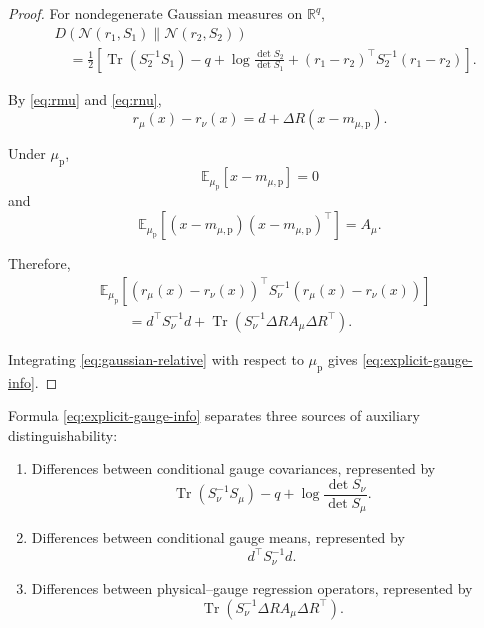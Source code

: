 \documentclass[11pt]{article}
\theoremstyle{remark}
\newcommand{\R}{\mathbb{R}}
\newcommand{\Tr}{\operatorname{Tr}}
\begin{document}
\begin{proof}
For nondegenerate Gaussian measures on \(\R^q\),
\begin{align}
&D\left(
\mathcal N(r_1,S_1)
\middle\|
\mathcal N(r_2,S_2)
\right)
\nonumber\\
&\quad=
\frac12
\left[
\Tr(S_2^{-1}S_1)
-
q
+
\log
\frac{
\det S_2
}{
\det S_1
}
+
(r_1-r_2)^\top
S_2^{-1}
(r_1-r_2)
\right].
\label{eq:gaussian-relative}
\end{align}

By \eqref{eq:rmu} and \eqref{eq:rnu},
\begin{equation}
r_\mu(x)-r_\nu(x)
=
d+\Delta R(x-m_{\mu,\mathrm p}).
\label{eq:r-difference}
\end{equation}

Under \(\mu_{\mathrm p}\),
\begin{equation}
\mathbb E_{\mu_{\mathrm p}}
\left[
x-m_{\mu,\mathrm p}
\right]
=
0
\label{eq:centered}
\end{equation}
and
\begin{equation}
\mathbb E_{\mu_{\mathrm p}}
\left[
(x-m_{\mu,\mathrm p})
(x-m_{\mu,\mathrm p})^\top
\right]
=
A_\mu.
\label{eq:covariance}
\end{equation}

Therefore,
\begin{align}
&
\mathbb E_{\mu_{\mathrm p}}
\left[
(r_\mu(x)-r_\nu(x))^\top
S_\nu^{-1}
(r_\mu(x)-r_\nu(x))
\right]
\nonumber\\
&\qquad=
d^\top S_\nu^{-1}d
+
\Tr\left(
S_\nu^{-1}
\Delta R
A_\mu
\Delta R^\top
\right).
\label{eq:expectation-quadratic}
\end{align}

Integrating \eqref{eq:gaussian-relative} with respect to
\(\mu_{\mathrm p}\) gives
\eqref{eq:explicit-gauge-info}.
\end{proof}

Formula \eqref{eq:explicit-gauge-info} separates three sources
of auxiliary distinguishability:

\begin{enumerate}
\item
Differences between conditional gauge covariances, represented
by
\begin{equation}
\Tr(S_\nu^{-1}S_\mu)
-
q
+
\log
\frac{
\det S_\nu
}{
\det S_\mu
}.
\end{equation}

\item
Differences between conditional gauge means, represented by
\begin{equation}
d^\top S_\nu^{-1}d.
\end{equation}

\item
Differences between physical--gauge regression operators,
represented by
\begin{equation}
\Tr\left(
S_\nu^{-1}
\Delta R
A_\mu
\Delta R^\top
\right).
\end{equation}
\end{enumerate}
\end{document}
